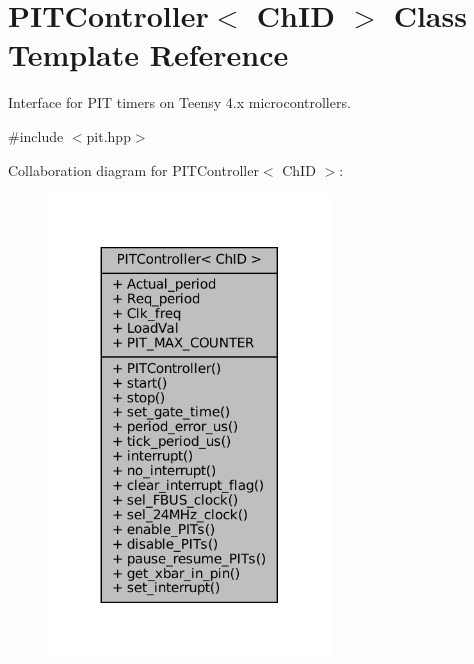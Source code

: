 \hypertarget{classPITController}{}\section{P\+I\+T\+Controller$<$ Ch\+ID $>$ Class Template Reference}
\label{classPITController}


Interface for P\+IT timers on Teensy 4.\+x microcontrollers.  




{\ttfamily \#include $<$pit.\+hpp$>$}



Collaboration diagram for P\+I\+T\+Controller$<$ Ch\+ID $>$\+:\nopagebreak
\begin{figure}[H]
\begin{center}
\leavevmode
\includegraphics[width=212pt]{d4/d1c/classPITController__coll__graph}
\end{center}
\end{figure}
